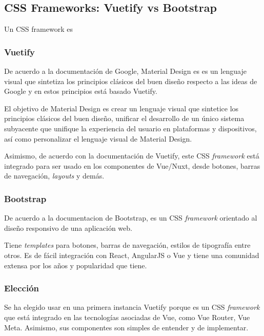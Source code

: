 \subsection{CSS Frameworks: Vuetify vs Bootstrap}
Un CSS framework es
\subsubsection*{Vuetify}
De acuerdo a la documentación de Google\cite{noauthor_introduction_nodate}, Material Design es es un lenguaje visual que sintetiza los principios clásicos del buen diseño respecto a las ideas de Google y en estos principios está basado Vuetify.


El objetivo de Material Design es crear un lenguaje visual que sintetice los principios clásicos del buen diseño, unificar el desarrollo de un único sistema subyacente que unifique la experiencia del usuario en plataformas y dispositivos, así como personalizar el lenguaje visual de Material Design.


Asimismo, de acuerdo con la documentación de Vuetify\cite{noauthor_vuetify_nodate}, este CSS \textit{framework} está integrado para ser usado en los componentes de Vue/Nuxt, desde botones, barras de navegación, \textit{layouts} y demás.

\subsubsection*{Bootstrap}

De acuerdo a la documentacion de Bootstrap\cite{noauthor_documentation_nodate-1}, es un CSS \textit{framework} orientado al diseño responsivo de una aplicación web. 


Tiene \textit{templates} para botones, barras de navegación, estilos de tipografía entre otros. Es de fácil integración con React, AngularJS o Vue y tiene una comunidad extensa por los años y popularidad que tiene.

\subsubsection*{Elección}

Se ha elegido usar en una primera instancia Vuetify porque es un CSS \textit{framework} que está integrado en las tecnologías asociadas de Vue, como Vue Router, Vue Meta. Asimismo, sus componentes son simples de entender y de implementar.
